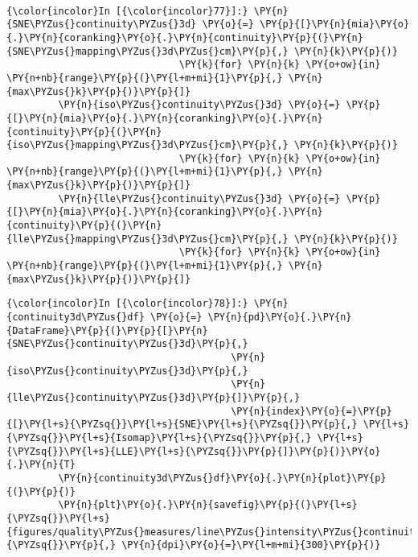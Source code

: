     \begin{center}
    \end{center}
    { \hspace*{\fill} \\}

    \begin{Verbatim}[commandchars=\\\{\}]
{\color{incolor}In [{\color{incolor}77}]:} \PY{n}{SNE\PYZus{}continuity\PYZus{}3d} \PY{o}{=} \PY{p}{[}\PY{n}{mia}\PY{o}{.}\PY{n}{coranking}\PY{o}{.}\PY{n}{continuity}\PY{p}{(}\PY{n}{SNE\PYZus{}mapping\PYZus{}3d\PYZus{}cm}\PY{p}{,} \PY{n}{k}\PY{p}{)}
                              \PY{k}{for} \PY{n}{k} \PY{o+ow}{in} \PY{n+nb}{range}\PY{p}{(}\PY{l+m+mi}{1}\PY{p}{,} \PY{n}{max\PYZus{}k}\PY{p}{)}\PY{p}{]}
         \PY{n}{iso\PYZus{}continuity\PYZus{}3d} \PY{o}{=} \PY{p}{[}\PY{n}{mia}\PY{o}{.}\PY{n}{coranking}\PY{o}{.}\PY{n}{continuity}\PY{p}{(}\PY{n}{iso\PYZus{}mapping\PYZus{}3d\PYZus{}cm}\PY{p}{,} \PY{n}{k}\PY{p}{)}
                              \PY{k}{for} \PY{n}{k} \PY{o+ow}{in} \PY{n+nb}{range}\PY{p}{(}\PY{l+m+mi}{1}\PY{p}{,} \PY{n}{max\PYZus{}k}\PY{p}{)}\PY{p}{]}
         \PY{n}{lle\PYZus{}continuity\PYZus{}3d} \PY{o}{=} \PY{p}{[}\PY{n}{mia}\PY{o}{.}\PY{n}{coranking}\PY{o}{.}\PY{n}{continuity}\PY{p}{(}\PY{n}{lle\PYZus{}mapping\PYZus{}3d\PYZus{}cm}\PY{p}{,} \PY{n}{k}\PY{p}{)}
                              \PY{k}{for} \PY{n}{k} \PY{o+ow}{in} \PY{n+nb}{range}\PY{p}{(}\PY{l+m+mi}{1}\PY{p}{,} \PY{n}{max\PYZus{}k}\PY{p}{)}\PY{p}{]}
\end{Verbatim}

    \begin{Verbatim}[commandchars=\\\{\}]
{\color{incolor}In [{\color{incolor}78}]:} \PY{n}{continuity3d\PYZus{}df} \PY{o}{=} \PY{n}{pd}\PY{o}{.}\PY{n}{DataFrame}\PY{p}{(}\PY{p}{[}\PY{n}{SNE\PYZus{}continuity\PYZus{}3d}\PY{p}{,}
                                       \PY{n}{iso\PYZus{}continuity\PYZus{}3d}\PY{p}{,}
                                       \PY{n}{lle\PYZus{}continuity\PYZus{}3d}\PY{p}{]}\PY{p}{,}
                                       \PY{n}{index}\PY{o}{=}\PY{p}{[}\PY{l+s}{\PYZsq{}}\PY{l+s}{SNE}\PY{l+s}{\PYZsq{}}\PY{p}{,} \PY{l+s}{\PYZsq{}}\PY{l+s}{Isomap}\PY{l+s}{\PYZsq{}}\PY{p}{,} \PY{l+s}{\PYZsq{}}\PY{l+s}{LLE}\PY{l+s}{\PYZsq{}}\PY{p}{]}\PY{p}{)}\PY{o}{.}\PY{n}{T}
         \PY{n}{continuity3d\PYZus{}df}\PY{o}{.}\PY{n}{plot}\PY{p}{(}\PY{p}{)}
         \PY{n}{plt}\PY{o}{.}\PY{n}{savefig}\PY{p}{(}\PY{l+s}{\PYZsq{}}\PY{l+s}{figures/quality\PYZus{}measures/line\PYZus{}intensity\PYZus{}continuity\PYZus{}3d.png}\PY{l+s}{\PYZsq{}}\PY{p}{,} \PY{n}{dpi}\PY{o}{=}\PY{l+m+mi}{300}\PY{p}{)}
\end{Verbatim}

